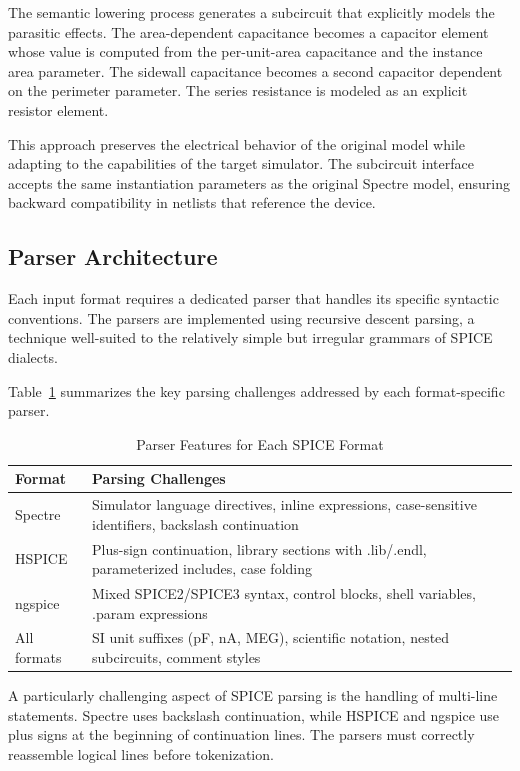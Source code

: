 \documentclass[conference]{IEEEtran}
\begin{document}
The semantic lowering process generates a subcircuit that explicitly models the parasitic effects. The area-dependent capacitance becomes a capacitor element whose value is computed from the per-unit-area capacitance and the instance area parameter. The sidewall capacitance becomes a second capacitor dependent on the perimeter parameter. The series resistance is modeled as an explicit resistor element.

This approach preserves the electrical behavior of the original model while adapting to the capabilities of the target simulator. The subcircuit interface accepts the same instantiation parameters as the original Spectre model, ensuring backward compatibility in netlists that reference the device.

\subsection{Parser Architecture}

Each input format requires a dedicated parser that handles its specific syntactic conventions. The parsers are implemented using recursive descent parsing, a technique well-suited to the relatively simple but irregular grammars of SPICE dialects.

Table~\ref{tab:parser_features} summarizes the key parsing challenges addressed by each format-specific parser.

\begin{table}[htbp]
\caption{Parser Features for Each SPICE Format}
\label{tab:parser_features}
\centering
\begin{tabular}{p{2.5cm}p{5cm}}
\toprule
\textbf{Format} & \textbf{Parsing Challenges} \\
\midrule
Spectre & Simulator language directives, inline expressions, case-sensitive identifiers, backslash continuation \\
HSPICE & Plus-sign continuation, library sections with .lib/.endl, parameterized includes, case folding \\
ngspice & Mixed SPICE2/SPICE3 syntax, control blocks, shell variables, .param expressions \\
\midrule
All formats & SI unit suffixes (pF, nA, MEG), scientific notation, nested subcircuits, comment styles \\
\bottomrule
\end{tabular}
\end{table}

A particularly challenging aspect of SPICE parsing is the handling of multi-line statements. Spectre uses backslash continuation, while HSPICE and ngspice use plus signs at the beginning of continuation lines. The parsers must correctly reassemble logical lines before tokenization.
\end{document}
